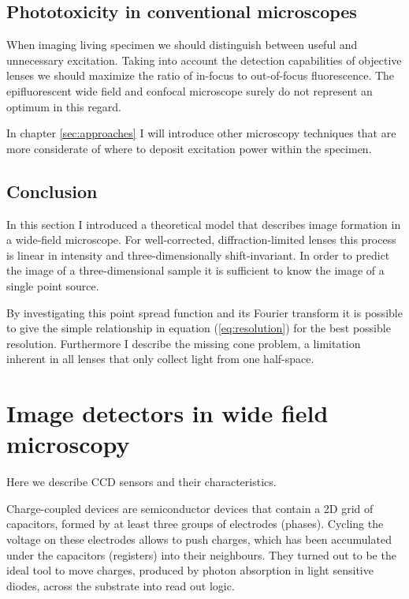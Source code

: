 \subsection{Phototoxicity in conventional microscopes}
When imaging living specimen we should distinguish between useful and
unnecessary excitation. Taking into account the detection capabilities
of objective lenses we should maximize the ratio of in-focus to
out-of-focus fluorescence. The epifluorescent wide field and confocal
microscope surely do not represent an optimum in this regard.

In chapter \ref{sec:approaches} I will introduce other microscopy
techniques that are more considerate of where to deposit excitation
power within the specimen.

\subsection{Conclusion}
\label{sec:widefield-conclusion}
In this section I introduced a theoretical model that describes image
formation in a wide-field microscope. For well-corrected,
diffraction-limited lenses this process is linear in intensity and
three-dimensionally shift-invariant. In order to predict the image of
a three-dimensional sample it is sufficient to know the image of a
single point source.

By investigating this point spread function and its Fourier transform
it is possible to give the simple relationship in equation
(\ref{eq:resolution}) for the best possible resolution. Furthermore I
describe the missing cone problem, a limitation inherent in all lenses
that only collect light from one half-space.



\section{Image detectors in wide field microscopy}
\label{sec:ccd-intro}
\begin{summary}
  Here we describe CCD
  sensors and their characteristics.
\end{summary}
Charge-coupled devices are semiconductor devices that contain a 2D
grid of capacitors, formed by at least three groups of electrodes
(phases). Cycling the voltage on these electrodes allows to push
charges, which has been accumulated under the capacitors (registers)
into their neighbours. They turned out to be the ideal tool to move
charges, produced by photon absorption in light sensitive diodes,
across the substrate into read out logic.

